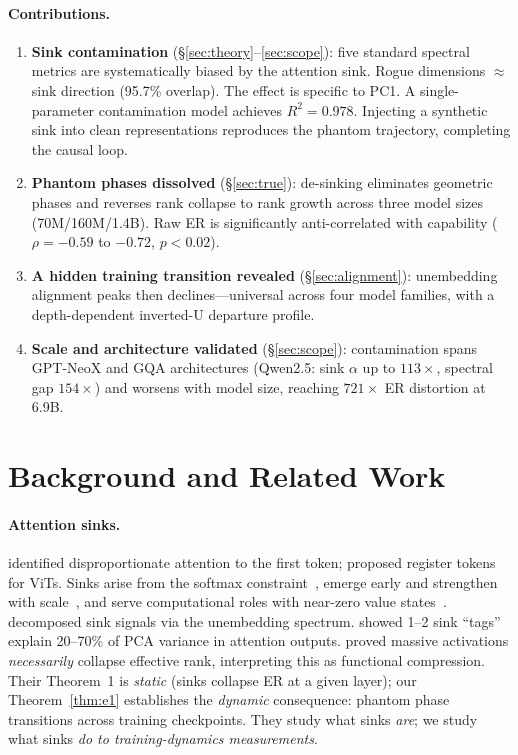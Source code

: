 \documentclass[11pt]{article}
\begin{document}
\paragraph{Contributions.}
\begin{enumerate}[leftmargin=1.5em,itemsep=0pt,topsep=1pt]
    \item \textbf{Sink contamination} (\S\ref{sec:theory}--\ref{sec:scope}): five standard spectral metrics are systematically biased by the attention sink. Rogue dimensions $\approx$ sink direction (95.7\% overlap). The effect is specific to PC1. A single-parameter contamination model achieves $R^2 = 0.978$. Injecting a synthetic sink into clean representations reproduces the phantom trajectory, completing the causal loop.
    \item \textbf{Phantom phases dissolved} (\S\ref{sec:true}): de-sinking eliminates geometric phases and reverses rank collapse to rank growth across three model sizes (70M/160M/1.4B). Raw ER is significantly anti-correlated with capability ($\rho = -0.59$ to $-0.72$, $p < 0.02$).
    \item \textbf{A hidden training transition revealed} (\S\ref{sec:alignment}): unembedding alignment peaks then declines---universal across four model families, with a depth-dependent inverted-U departure profile.
    \item \textbf{Scale and architecture validated} (\S\ref{sec:scope}): contamination spans GPT-NeoX and GQA architectures (Qwen2.5: sink $\alpha$ up to $113\times$, spectral gap $154\times$) and worsens with model size, reaching $721\times$ ER distortion at 6.9B.
\end{enumerate}

\section{Background and Related Work}\label{sec:related}

\paragraph{Attention sinks.}
\citet{xiao2024efficient} identified disproportionate attention to the first token; \citet{darcet2024vision} proposed register tokens for ViTs.
Sinks arise from the softmax constraint~\citep{sun2024massive}, emerge early and strengthen with scale~\citep{gu2025attention}, and serve computational roles with near-zero value states~\citep{barbero2025why}.
\citet{cancedda2024spectral} decomposed sink signals via the unembedding spectrum.
\citet{zhang2025catch} showed 1--2 sink ``tags'' explain 20--70\% of PCA variance in attention outputs.
\citet{queipodellano2025sinks} proved massive activations \emph{necessarily} collapse effective rank, interpreting this as functional compression.
Their Theorem~1 is \emph{static} (sinks collapse ER at a given layer); our Theorem~\ref{thm:e1} establishes the \emph{dynamic} consequence: phantom phase transitions across training checkpoints.
They study what sinks \emph{are}; we study what sinks \emph{do to training-dynamics measurements}.
\end{document}

